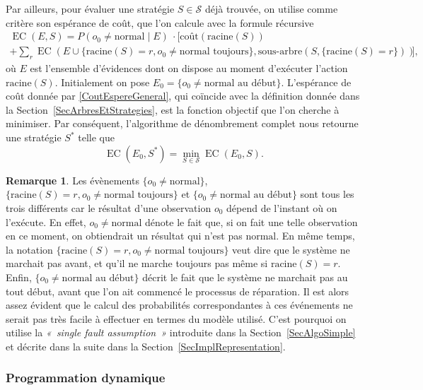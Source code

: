\documentclass[a4paper,11pt]{article}
\theoremstyle{plain}
\theoremstyle{definition}
\newtheorem*{remk}{Remarque}
\DeclareMathOperator{\EC}{EC}
\begin{document}
Par ailleurs, pour évaluer une stratégie $S \in \mathcal S$ déjà trouvée, on utilise comme critère son espérance de coût, que l'on calcule avec la formule récursive
\begin{multline}
\label{CoutEspereGeneral}
\EC(E, S) = P(o_0 \neq \text{normal} \mid E) \: \cdot \Biggl[\text{coût}(\text{racine}(S)) \\ + \sum_{r} \EC(E \cup \{\text{racine}(S) = r, o_0 \neq \text{normal toujours}\}, \text{sous-arbre}(S, \{\text{racine}(S) = r\}))\Biggr],
\end{multline}
où $E$ est l'ensemble d'évidences dont on dispose au moment d'exécuter l'action $\text{racine}(S)$. Initialement on pose $E_0 = \{o_0 \neq \text{normal au début}\}$. L'espérance de coût donnée par \eqref{CoutEspereGeneral}, qui coïncide avec la définition donnée dans la Section~\ref{SecArbresEtStrategies}, est la fonction objectif que l'on cherche à minimiser. Par conséquent, l'algorithme de dénombrement complet nous retourne une stratégie $S^*$ telle que
\begin{equation}
\label{SolMainProblem}
\EC(E_0, S^*) = \min_{S \in \mathcal S} {\EC(E_0, S)}.
\end{equation}

\begin{remk}
Les évènements $\{o_0 \neq \text{normal}\}$, $\{\text{racine}(S) = r, o_0 \neq \text{normal toujours}\}$ et $\{o_0 \neq \text{normal }\allowbreak\text{au }\allowbreak\text{début}\}$ sont tous les trois différents car le résultat d'une observation $o_0$ dépend de l'instant où on l'exécute. En effet, $o_0 \neq \text{normal}$ dénote le fait que, si on fait une telle observation en ce moment, on obtiendrait un résultat qui n'est pas $\text{normal}$. En même temps, la notation $\{\text{racine}(S) = r, o_0 \neq \text{normal toujours}\}$ veut dire que le système ne marchait pas avant, et qu'il ne marche toujours pas même si $\text{racine}(S) = r$. Enfin, $\{o_0 \neq \text{normal au début}\}$ décrit le fait que le système ne marchait pas au tout début, avant que l'on ait commencé le processus de réparation. Il est alors assez évident que le calcul des probabilités correspondantes à ces événements ne serait pas très facile à effectuer en termes du modèle utilisé. C'est pourquoi on utilise la \emph{«~single fault assumption~»} introduite dans la Section~\ref{SecAlgoSimple} et décrite dans la suite dans la Section~\ref{SecImplRepresentation}.
\end{remk}

\subsubsection{Programmation dynamique}
\label{SecProgDyn}
\end{document}
